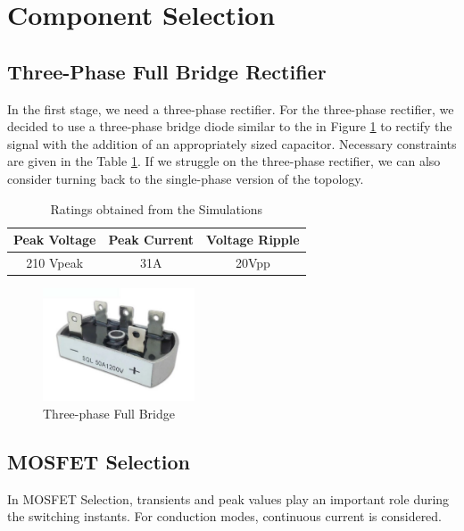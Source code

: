 \section{Component Selection} \label{component}

\subsection{Three-Phase Full Bridge Rectifier}
In the first stage, we need a three-phase rectifier. For the three-phase rectifier, we decided to use a three-phase bridge diode similar to the \cite{three-phase_bridge} in Figure \ref{fig:bridge} to rectify the signal with the addition of an appropriately sized capacitor. Necessary constraints are given in the Table \ref{tab:ratings_diode}. If we struggle on the three-phase rectifier, we can also consider turning back to the single-phase version of the topology.

\begin{table}[ht]
    \centering
        \begin{tabular}{|c|c|c|}
        \hline
         Peak Voltage   & Peak Current    & Voltage Ripple  \\ 
        \hline
         210 Vpeak      & 31A             & 20Vpp           \\
        \hline
        \end{tabular}
    \caption{Ratings obtained from the Simulations}
    \label{tab:ratings_diode}
\end{table}

\begin{figure}[ht]
    \centering
    \includegraphics[width=0.4\textwidth]{matlab/bridge_diode.png}
    \caption{Three-phase Full Bridge}
    \label{fig:bridge}
\end{figure}

\subsection{MOSFET Selection}
In MOSFET Selection, transients and peak values play an important role during the switching instants. For conduction modes, continuous current is considered.

